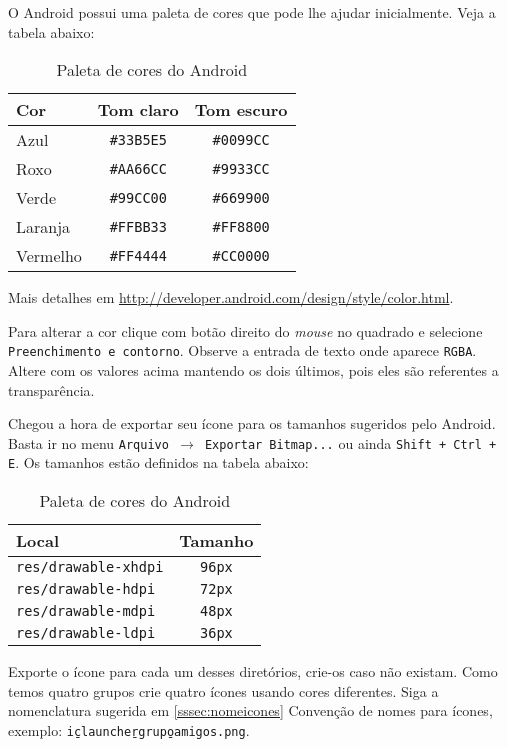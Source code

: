 O Android possui uma paleta de cores que pode lhe ajudar inicialmente. Veja a tabela abaixo:

\begin{table}[H]
\begin{tabularx}{300pt}{Xcc}
\hline
\textbf{Cor} & \textbf{Tom claro} & \textbf{Tom escuro}\\
\hline
Azul & \texttt{\#33B5E5} & \texttt{\#0099CC}\\
Roxo & \texttt{\#AA66CC} & \texttt{\#9933CC}\\
Verde & \texttt{\#99CC00} & \texttt{\#669900}\\
Laranja & \texttt{\#FFBB33} & \texttt{\#FF8800}\\
Vermelho & \texttt{\#FF4444} & \texttt{\#CC0000}\\
\hline
\end{tabularx}
\caption{Paleta de cores do Android}
\end{table}

Mais detalhes em \url{http://developer.android.com/design/style/color.html}.

\bigskip

Para alterar a cor clique com botão direito do \textit{mouse} no quadrado e selecione
\texttt{Preenchimento e contorno}. Observe a entrada de texto onde aparece \texttt{RGBA}.
Altere com os valores acima mantendo os dois últimos, pois eles são referentes a transparência.

Chegou a hora de exportar seu ícone para os tamanhos sugeridos pelo Android. Basta ir no menu
\texttt{Arquivo $\rightarrow$ Exportar Bitmap...} ou ainda \texttt{Shift + Ctrl + E}. Os tamanhos
estão definidos na tabela abaixo:

\begin{table}[H]
\begin{tabularx}{300pt}{Xc}
\hline
\textbf{Local} & \textbf{Tamanho}\\
\hline
\texttt{res/drawable-xhdpi} & \texttt{96px}\\
\texttt{res/drawable-hdpi} & \texttt{72px}\\
\texttt{res/drawable-mdpi} & \texttt{48px}\\
\texttt{res/drawable-ldpi} & \texttt{36px}\\
\hline
\end{tabularx}
\caption{Paleta de cores do Android}
\end{table}

Exporte o ícone para cada um desses diretórios, crie-os caso não existam. Como temos quatro
grupos crie quatro ícones usando cores diferentes. Siga a nomenclatura sugerida em \ref{sssec:nomeicones}
Convenção de nomes para ícones, exemplo: \texttt{ic\b{ }launcher\b{ }grupo\b{ }amigos.png}.

